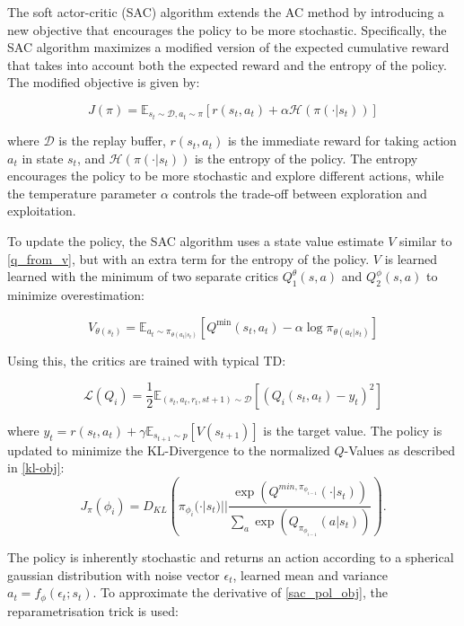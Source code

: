 The soft actor-critic (SAC) algorithm extends the AC method by introducing a new objective that encourages the policy to be more stochastic. Specifically, the SAC algorithm maximizes a modified 
version of the expected cumulative reward that takes into account both the expected reward and the entropy of the policy. The modified objective is given by:

\begin{equation}
J(\pi) = \mathbb{E}_{s_t \sim \mathcal{D}, a_t \sim \pi}[r(s_t, a_t) + \alpha \mathcal{H}(\pi(\cdot|s_t))]
\end{equation}

where $\mathcal{D}$ is the replay buffer, $r(s_t, a_t)$ is the immediate reward for taking action $a_t$ in state $s_t$, and $\mathcal{H}(\pi(\cdot|s_t))$ is the entropy of the policy. The entropy 
encourages the policy to be more stochastic and explore different actions, while the temperature parameter $\alpha$ controls the trade-off between exploration and exploitation.

To update the policy, the SAC algorithm uses a state value estimate $V$ similar to \ref{q_from_v}, but with an extra term for the entropy of the policy. 
$V$ is learned learned with the minimum of two separate critics $Q_1^\theta(s,a)$ and $Q_2^\phi(s,a)$ to minimize overestimation:

\begin{equation}
    V_{\theta(s_t)} = \mathbb{E}_{a_t \sim \pi_{\theta(a_t|s_t)}}[Q^\text{min}(s_t, a_t) - \alpha \log \pi_{\theta(a_t|s_t)}]
\end{equation}

Using this, the critics are trained with typical TD:

\begin{equation}
    \mathcal{L}(Q_i) = \frac{1}{2}\mathbb{E}_{(s_t, a_t, r_t, s{t+1}) \sim \mathcal{D}}[(Q_i(s_t,a_t) - y_t)^2]
\end{equation}

where $y_t = r(s_t, a_t) + \gamma \mathbb{E}_{s_{t+1} \sim p}[V(s_{t+1})]$ is the target value. The policy is updated to minimize the KL-Divergence to the normalized $Q$-Values as described in \ref{kl-obj}:
\begin{equation}
    \label{sac_pol_obj}
    J_\pi(\phi_{i}) = D_{KL} \left( \pi_{\phi_{i}}(\cdot|s_t) || \frac{\exp(Q^{min, \pi_{\phi_{i-1}}}(\cdot|s_t))}{\underset{a}{\sum}  \exp(Q_{\pi_{\phi_{i-1}}}(a|s_t))} \right).
\end{equation}

The policy is inherently stochastic and returns an action according to a spherical gaussian distribution with noise vector $\epsilon_t$, learned mean and variance $a_t = f_{\phi}(\epsilon_t;s_t)$. 
To approximate the derivative of \ref{sac_pol_obj}, the reparametrisation trick is used:

